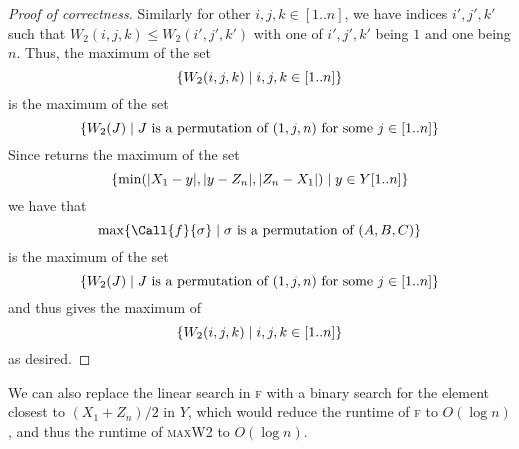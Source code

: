 \documentclass[12pt]{article}
\begin{document}
\begin{solution}
\begin{enumerate}[wide]
\begin{proof}[Proof of correctness]
                Similarly for other $i, j, k \in [1..n]$, we have indices $i', j', k'$
                such that $W_2(i, j, k) \leq W_2(i', j', k')$ with one of
                $i', j', k'$ being $1$ and one being $n$.
                Thus, the maximum of the set \[
                    \set{W_2(i, j, k) \mid i, j, k \in [1..n]}
                \] is the maximum of the set \[
                    \set{W_2(J) \mid J \text{ is a permutation of } (1, j, n) \text{ for some } j \in [1..n]}
                \]
                Since  returns the maximum of the set \[
                    \set{\min(\abs{X_1 - y}, \abs{y - Z_{n}}, \abs{Z_{n} - X_{1}}) \mid y \in Y[1..n]}
                \] we have that \[
                    \max\set{\Call{f}{\sigma} \mid \sigma \text{ is a permutation of } (A, B, C)}
                \] is the maximum of the set \[
                    \set{W_2(J) \mid J \text{ is a permutation of } (1, j, n) \text{ for some } j \in [1..n]}
                \] and thus gives the maximum of \[
                    \set{W_2(i, j, k) \mid i, j, k \in [1..n]}
                \] as desired.
            \end{proof}
            We can also replace the linear search in \textsc{f} with a binary search
            for the element closest to $(X_1 + Z_{n}) / 2$ in $Y$, which would
            reduce the runtime of \textsc{f} to $O(\log n)$, and thus the runtime
            of \textsc{maxW2} to $O(\log n)$.
    \end{enumerate}
\end{solution}
\end{document}

